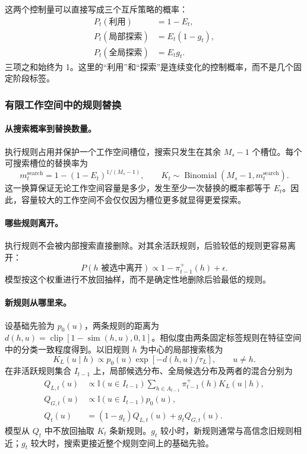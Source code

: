 这两个控制量可以直接写成三个互斥策略的概率：
\begin{align}
P_t(\text{利用})&=1-E_t,
\nonumber\\
P_t(\text{局部探索})&=E_t(1-g_t),
\nonumber\\
P_t(\text{全局探索})&=E_tg_t.
\label{eq:dynamic-strategy-decomposition}
\end{align}
三项之和始终为 1。这里的“利用”和“探索”是连续变化的控制概率，而不是几个固定阶段标签。


\subsubsection{有限工作空间中的规则替换}

\paragraph{从搜索概率到替换数量。}
执行规则占用并保护一个工作空间槽位，搜索只发生在其余 $M_s-1$ 个槽位。每个可搜索槽位的替换率为
\begin{equation}
m_t^{\mathrm{search}}
=1-(1-E_t)^{1/(M_s-1)},
\qquad
K_t\sim\operatorname{Binomial}(M_s-1,m_t^{\mathrm{search}}).
\label{eq:dynamic-protected-search}
\end{equation}
这一换算保证无论工作空间容量是多少，发生至少一次替换的概率都等于 $E_t$。因此，容量较大的工作空间不会仅仅因为槽位更多就显得更爱探索。

\paragraph{哪些规则离开。}
执行规则不会被内部搜索直接删除。对其余活跃规则，后验较低的规则更容易离开：
\begin{equation}
P(h\text{ 被选中离开})
\propto 1-\pi_{t-1}^{+}(h)+\epsilon.
\label{eq:dynamic-drop-rule}
\end{equation}
模型按这个权重进行不放回抽样，而不是确定性地删除后验最低的规则。

\paragraph{新规则从哪里来。}
设基础先验为 $p_0(u)$，两条规则的距离为
$d(h,u)=\operatorname{clip}[1-\operatorname{sim}(h,u),0,1]$。相似度由两条固定标签规则在特征空间中的分类一致程度得到。以旧规则 $h$ 为中心的局部搜索核为
\begin{equation}
K_L(u\mid h)
\propto p_0(u)\exp[-d(h,u)/\tau_L],
\qquad u\ne h.
\label{eq:dynamic-local-kernel}
\end{equation}
在非活跃规则集合 $I_{t-1}$ 上，局部候选分布、全局候选分布及两者的混合分别为
\begin{align}
Q_{L,t}(u)
&\propto
\mathbb I(u\in I_{t-1})
\sum_{h\in A_{t-1}}\pi_{t-1}^{+}(h)K_L(u\mid h),
\nonumber\\
Q_{G,t}(u)
&\propto\mathbb I(u\in I_{t-1})p_0(u),
\nonumber\\
Q_t(u)
&=(1-g_t)Q_{L,t}(u)+g_tQ_{G,t}(u).
\label{eq:dynamic-newcomer-proposal}
\end{align}
模型从 $Q_t$ 中不放回抽取 $K_t$ 条新规则。$g_t$ 较小时，新规则通常与高信念旧规则相近；$g_t$ 较大时，搜索更接近整个规则空间上的基础先验。

